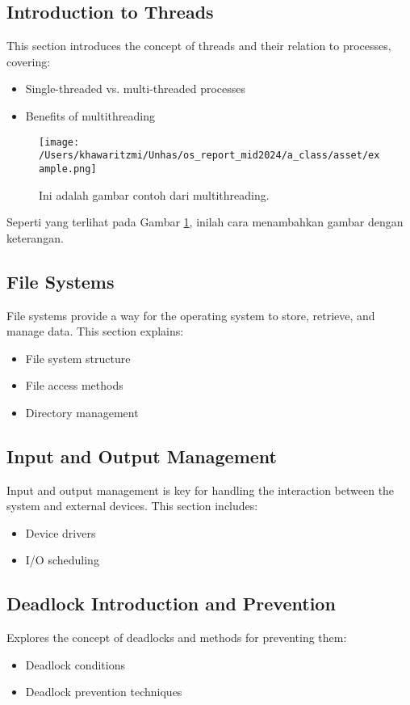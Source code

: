 \documentclass[12pt]{article}
\begin{document}
\subsection{Introduction to Threads}
This section introduces the concept of threads and their relation to processes, covering:
\begin{itemize}
    \item Single-threaded vs. multi-threaded processes
    \item Benefits of multithreading
\end{itemize}

\begin{figure}[h]
    \centering
    \texttt{[image: /Users/khawaritzmi/Unhas/os\_report\_mid2024/a\_class/asset/example.png]}  %
    \caption{Ini adalah gambar contoh dari multithreading.}
    \label{fig:contoh_gambar}
\end{figure}

Seperti yang terlihat pada Gambar \ref{fig:contoh_gambar}, inilah cara menambahkan gambar dengan keterangan.

\subsection{File Systems}
File systems provide a way for the operating system to store, retrieve, and manage data. This section explains:
\begin{itemize}
    \item File system structure
    \item File access methods
    \item Directory management
\end{itemize}

\subsection{Input and Output Management}
Input and output management is key for handling the interaction between the system and external devices. This section includes:
\begin{itemize}
    \item Device drivers
    \item I/O scheduling
\end{itemize}

\subsection{Deadlock Introduction and Prevention}
Explores the concept of deadlocks and methods for preventing them:
\begin{itemize}
    \item Deadlock conditions
    \item Deadlock prevention techniques
\end{itemize}
\end{document}
